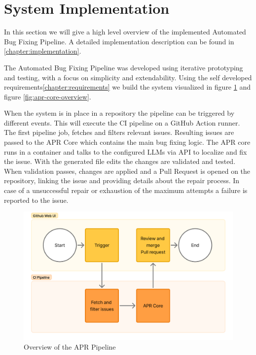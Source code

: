 \section{System Implementation}

In this section we will give a high level overview of the implemented Automated Bug Fixing Pipeline. A detailed implementation description can be found in \ref{chapter:implementation}.

The Automated Bug Fixing Pipeline was developed using iterative prototyping and testing, with a focus on simplicity and extendability. Using the self developed requirements\ref{chapter:requirements} we build the system visualized in figure \ref{fig:high-level} and figure \ref{fig:apr-core-overview}.

When the system is in place in a repository the pipeline can be triggered by different events. This will execute the CI pipeline on a GitHub Action runner. The first pipeline job, fetches and filters relevant issues. Resulting issues are passed to the APR Core which contains the main bug fixing logic. The APR core runs in a container and talks to the configured LLMs via API to localize and fix the issue. With the generated file edits the changes are validated and tested. When validation passes, changes are applied and a Pull Request is opened on the repository, linking the issue and providing details about the repair process. In case of a unsuccessful repair or exhaustion of the maximum attempts a failure is reported to the issue.

\begin{figure}[H]
    \centering
    \includegraphics[width=1\textwidth]{images/flowcharts/overview.png}
    \caption{Overview of the APR Pipeline}
    \label{fig:high-level}
\end{figure}

